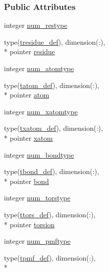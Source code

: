 \subsubsection*{Public Attributes}
\begin{DoxyCompactItemize}
\item 
integer \hyperlink{structcalc__xscore_1_1txff_a3c3fd31e36a622a7ca162f6bf3b0da3b}{num\-\_\-restype}
\item 
type(\hyperlink{structcalc__xscore_1_1tresidue__def}{tresidue\-\_\-def}), dimension(\-:), \\*
pointer \hyperlink{structcalc__xscore_1_1txff_ac2fcc0c3d2f466693f80dcea081002e7}{residue}
\item 
integer \hyperlink{structcalc__xscore_1_1txff_a3054dd3813b39fd6de0db5e461dcc2f8}{num\-\_\-atomtype}
\item 
type(\hyperlink{structcalc__xscore_1_1tatom__def}{tatom\-\_\-def}), dimension(\-:), \\*
pointer \hyperlink{structcalc__xscore_1_1txff_a2c4aa78c3a40e0da8a5ee4189872ad80}{atom}
\item 
integer \hyperlink{structcalc__xscore_1_1txff_abd9cc840095c66340c859496fbd4958c}{num\-\_\-xatomtype}
\item 
type(\hyperlink{structcalc__xscore_1_1txatom__def}{txatom\-\_\-def}), dimension(\-:), \\*
pointer \hyperlink{structcalc__xscore_1_1txff_ae35d5e5460fce9bf72d477dff87a02d4}{xatom}
\item 
integer \hyperlink{structcalc__xscore_1_1txff_a8bbaa5e773076359286cb4e1d75605ab}{num\-\_\-bondtype}
\item 
type(\hyperlink{structcalc__xscore_1_1tbond__def}{tbond\-\_\-def}), dimension(\-:), \\*
pointer \hyperlink{structcalc__xscore_1_1txff_ad076e5d8a4c00d6feca1e704e0334cde}{bond}
\item 
integer \hyperlink{structcalc__xscore_1_1txff_a1cf64793d2160551a151becb3eed55b9}{num\-\_\-torstype}
\item 
type(\hyperlink{structcalc__xscore_1_1ttors__def}{ttors\-\_\-def}), dimension(\-:), \\*
pointer \hyperlink{structcalc__xscore_1_1txff_aa46011345d63733f59e6d999c7c9265c}{torsion}
\item 
integer \hyperlink{structcalc__xscore_1_1txff_a7e20d13b5a296ac14134a1f199f7c6d0}{num\-\_\-pmftype}
\item 
type(\hyperlink{structcalc__xscore_1_1tpmf__def}{tpmf\-\_\-def}), dimension(\-:), \\*

\end{DoxyCompactItemize}
